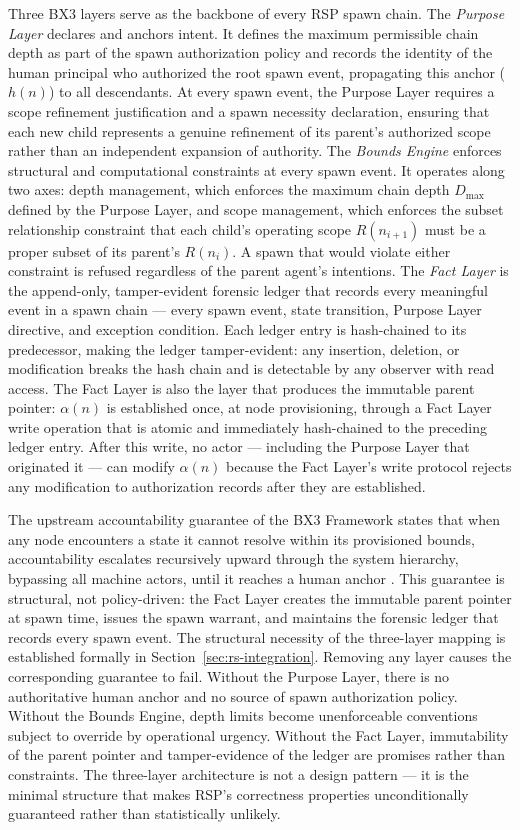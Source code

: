 Three BX3 layers serve as the backbone of every RSP spawn chain. The \textit{Purpose Layer} declares and anchors intent. It defines the maximum permissible chain depth as part of the spawn authorization policy and records the identity of the human principal who authorized the root spawn event, propagating this anchor ($h(n)$) to all descendants. At every spawn event, the Purpose Layer requires a scope refinement justification and a spawn necessity declaration, ensuring that each new child represents a genuine refinement of its parent's authorized scope rather than an independent expansion of authority. The \textit{Bounds Engine} enforces structural and computational constraints at every spawn event. It operates along two axes: depth management, which enforces the maximum chain depth $D_{\max}$ defined by the Purpose Layer, and scope management, which enforces the subset relationship constraint that each child's operating scope $R(n_{i+1})$ must be a proper subset of its parent's $R(n_i)$. A spawn that would violate either constraint is refused regardless of the parent agent's intentions. The \textit{Fact Layer} is the append-only, tamper-evident forensic ledger that records every meaningful event in a spawn chain --- every spawn event, state transition, Purpose Layer directive, and exception condition. Each ledger entry is hash-chained to its predecessor, making the ledger tamper-evident: any insertion, deletion, or modification breaks the hash chain and is detectable by any observer with read access. The Fact Layer is also the layer that produces the immutable parent pointer: $\alpha(n)$ is established once, at node provisioning, through a Fact Layer write operation that is atomic and immediately hash-chained to the preceding ledger entry. After this write, no actor --- including the Purpose Layer that originated it --- can modify $\alpha(n)$ because the Fact Layer's write protocol rejects any modification to authorization records after they are established.

The upstream accountability guarantee of the BX3 Framework states that when any node encounters a state it cannot resolve within its provisioned bounds, accountability escalates recursively upward through the system hierarchy, bypassing all machine actors, until it reaches a human anchor \cite{bx3framework2026}. This guarantee is structural, not policy-driven: the Fact Layer creates the immutable parent pointer at spawn time, issues the spawn warrant, and maintains the forensic ledger that records every spawn event. The structural necessity of the three-layer mapping is established formally in Section~\ref{sec:rs-integration}. Removing any layer causes the corresponding guarantee to fail. Without the Purpose Layer, there is no authoritative human anchor and no source of spawn authorization policy. Without the Bounds Engine, depth limits become unenforceable conventions subject to override by operational urgency. Without the Fact Layer, immutability of the parent pointer and tamper-evidence of the ledger are promises rather than constraints. The three-layer architecture is not a design pattern --- it is the minimal structure that makes RSP's correctness properties unconditionally guaranteed rather than statistically unlikely.

